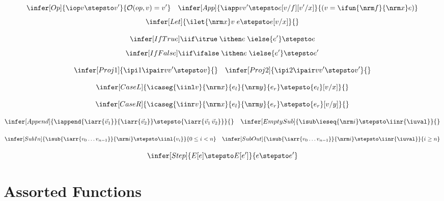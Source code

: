 \[
\infer[Op]{
  \iop v \stepsto v'
}{
  \mathcal{O}({op},v) = v'
}
\quad
\infer[App]{
  \iapp v {v'} \stepsto e[v/f][v'/x]
}{
  (v = \ifun {\nrm f}{\nrm x} e)
}
\]
\[%
\infer[Let]{
  \ilet {\nrm x} v \; e
  \stepsto e[v/x]
}{}
\]

\[
\infer[{IfTrue}]{
  \iif \itrue \; \ithen e \; \ielse {e'} \stepsto
  e
}{}
\]
\[%
\infer[{IfFalse}]{
  \iif \ifalse \; \ithen e \; \ielse {e'} \stepsto
  e'
}{}
\]

\[
\infer[Proj1]{
  \ipi 1 {\ipair v {v'}} \stepsto v
}{}
\quad
\infer[Proj2]{
  \ipi 2 {\ipair v {v'}} \stepsto v'
}{}
\]

\[
\infer[CaseL]{
  \icaseg{\iinl v}{\nrm x}{e_l}{\nrm y}{e_r}
  \stepsto {e_l}[v/x]
}{}
\]

\[%
\infer[CaseR]{
  \icaseg{\iinr v}{\nrm x}{e_l}{\nrm y}{e_r}
  \stepsto {e_r}[v/y]
}{}
\]

\[
\infer[Append]{
  \iappend {\iarr{\vec v_1}} {\iarr{\vec v_2}} \stepsto
  {\iarr{\vec v_1 \, \vec v_2}}
}{}
\quad
\infer[EmptySub]{
  \isub \ieseq {\nrm i} \stepsto \iinr{\iuval}
}{}
\]

\[
\infer[SubIn]{
  \isub {\iarr{v_0 \ldots v_{n-1}}} {\nrm i}
  \stepsto \iinl {v_{i}}
}{
  0 \leq i < n
}
\quad
\infer[SubOut]{
  \isub {\iarr{v_0 \ldots v_{n-1}}} {\nrm i}
  \stepsto \iinr{\iuval}
}{
  i \geq n
}
\]

\[
\infer[Step]{
  E[e] \stepsto E[e']
}{
  e \stepsto e'
}
\]

\section{Assorted Functions}
\label{sec:asst-functions}
\label{sec:ty-constructors}

